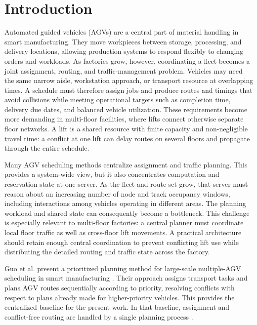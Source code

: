 \section{Introduction}

Automated guided vehicles (AGVs) are a central part of material handling in
smart manufacturing. They move workpieces between storage, processing, and
delivery locations, allowing production systems to respond flexibly to
changing orders and workloads. As factories grow, however, coordinating a
fleet becomes a joint assignment, routing, and traffic-management problem.
Vehicles may need the same narrow aisle, workstation approach, or transport
resource at overlapping times. A schedule must therefore assign jobs and
produce routes and timings that avoid collisions while meeting operational
targets such as completion time, delivery due dates, and balanced vehicle
utilization. These requirements become more demanding in multi-floor
facilities, where lifts connect otherwise separate floor networks. A lift is
a shared resource with finite capacity and non-negligible travel time: a
conflict at one lift can delay routes on several floors and propagate through
the entire schedule.

Many AGV scheduling methods centralize assignment and traffic planning. This
provides a system-wide view, but it also concentrates computation and
reservation state at one server. As the fleet and route set grow, that server
must reason about an increasing number of node and track occupancy windows,
including interactions among vehicles operating in different areas. The
planning workload and shared state can consequently become a bottleneck.
This challenge is especially relevant to multi-floor factories: a central
planner must coordinate local floor traffic as well as cross-floor lift
movements. A practical architecture should retain enough central coordination
to prevent conflicting lift use while distributing the detailed routing and
traffic state across the factory.

Guo et al. present a prioritized planning method for large-scale multiple-AGV
scheduling in smart manufacturing \cite{guo2024}. Their approach assigns
transport tasks and plans AGV routes sequentially according to priority,
resolving conflicts with respect to plans already made for higher-priority
vehicles. This provides the centralized baseline for the present work. In
that baseline, assignment and conflict-free routing are handled by a single
planning process \cite{guo2024}.

